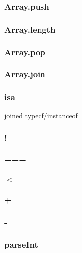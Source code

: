 \subsubsection{Array.push}
\subsubsection{Array.length}
\subsubsection{Array.pop}
\subsubsection{Array.join}
\subsubsection{isa}
joined typeof/instanceof
\subsubsection{!}
\subsubsection{===}
\subsubsection{$<$}
\subsubsection{+}
\subsubsection{-}
\subsubsection{parseInt}
